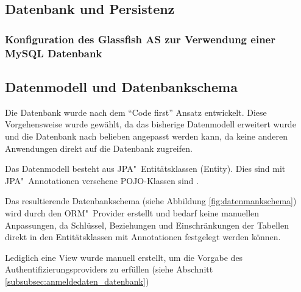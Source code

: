 \subsection{Datenbank und Persistenz\label{subsec:datenbank}}


\subsubsection{Konfiguration des Glassfish AS zur Verwendung einer MySQL Datenbank}

\subsection{Datenmodell und Datenbankschema}
Die Datenbank wurde nach dem \enquote{Code first} Ansatz entwickelt.
Diese Vorgehensweise wurde gewählt, da das bisherige Datenmodell erweitert wurde und die Datenbank nach belieben angepasst werden kann, da keine anderen Anwendungen direkt auf die Datenbank zugreifen.

Das Datenmodell besteht aus \ac{JPA}"~Entitätsklassen (Entity). 
Dies sind mit \ac{JPA}"~Annotationen versehene \ac{POJO}-Klassen sind \cite[vgl.][17-19]{Keith.2013}.

Das resultierende Datenbankschema (siehe Abbildung \ref{fig:datenmankschema}) wird durch den \ac{ORM}"~Provider erstellt und bedarf keine manuellen Anpassungen, da Schlüssel, Beziehungen und Einschränkungen der Tabellen direkt in den Entitätsklassen mit Annotationen festgelegt werden können.

Lediglich eine View wurde manuell erstellt, um die Vorgabe des Authentifizierungsproviders zu erfüllen (siehe Abschnitt \ref{subsubsec:anmeldedaten_datenbank})

